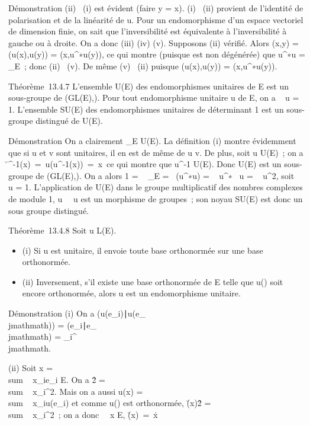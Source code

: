 \documentclass[]{article}
\begin{document}
Démonstration (ii) \rigtharrow~(i) est évident (faire y = x). (i) \rigtharrow~(ii) provient de
l'identité de polarisation et de la linéarité de u. Pour un
endomorphisme d'un espace vectoriel de dimension finie, on sait que
l'inversibilité est équivalente à l'inversibilité à gauche ou à droite.
On a donc (iii) \Leftrightarrow (iv)
\Leftrightarrow (v). Supposons (ii) vérifié. Alors \phi(x,y) =
\phi(u(x),u(y)) = \phi(x,u^∗\cdot u(y)), ce qui montre (puisque \phi est
non dégénérée) que u^∗\cdot u =
\mathrmId_E~; donc (ii) \rigtharrow~(v). De même (v)
\rigtharrow~(ii) puisque \phi(u(x),u(y)) = \phi(x,u^∗\cdot u(y)).

Théorème~13.4.7 L'ensemble U(E) des endomorphismes unitaires de E est un
sous-groupe de (GL(E),\cdot). Pour tout endomorphisme unitaire u de E, on a
~
u = 1. L'ensemble SU(E) des endomorphismes unitaires de
déterminant 1 est un sous-groupe distingué de U(E).

Démonstration On a clairement \mathrmId_E \in
U(E). La définition (i) montre évidemment que si u et v sont unitaires,
il en est de même de u \cdot v. De plus, soit u \in U(E)~; on a
\u^-1(x)\
=\
u(u^-1(x))\
=\ x\ ce qui montre
que u^-1 \in U(E). Donc U(E) est un sous-groupe de (GL(E),\cdot).
On a alors 1 = ~
\mathrmId_E =\
 (u^∗\cdot u)
= ~
u^∗\mathrm{det}~ u
= ~
u^2, soit
\mathrm{det}~
u = 1. L'application de U(E) dans le groupe multiplicatif des
nombres complexes de module 1,
u\mapsto~\mathrm{det}~
u est un morphisme de groupes~; son noyau SU(E) est donc un sous groupe
distingué.

Théorème~13.4.8 Soit u \in L(E).

\begin{itemize}
\itemsep1pt\parskip0pt
\item
  (i) Si u est unitaire, il envoie toute base orthonormée sur une base
  orthonormée.
\item
  (ii) Inversement, s'il existe une base orthonormée  de E telle que
  u(\mathcal{E}) soit encore orthonormée, alors u est un endomorphisme unitaire.
\end{itemize}

Démonstration (i) On a
(u(e_i)∣u(e_\\jmathmath)) =
(e_i∣e_\\jmathmath) =
\delta_i^\\jmathmath.

(ii) Soit x = \\sum ~
x_ie_i \in E. On a
\x\^2
= \\sum ~
x_i^2. Mais on a aussi u(x)
= \\sum ~
x_iu(e_i) et comme u() est orthonormée,
\u(x)\^2
= \\sum ~
x_i^2~; on a donc
\forall~~x \in E,
\u(x)\
=\ x\.
\end{document}
